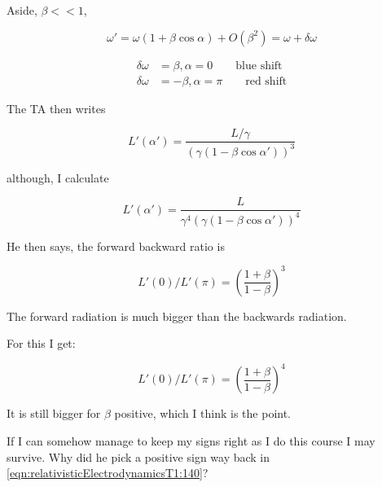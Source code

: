 Aside, $\beta << 1$, 

\begin{equation}\label{eqn:relativisticElectrodynamicsT1:230}
\omega' = \omega ( 1 + \beta \cos\alpha) + O(\beta^2) = \omega + \delta \omega
\end{equation}

\begin{align}\label{eqn:relativisticElectrodynamicsT1:240}
\delta \omega &= \beta, \alpha = 0 		\qquad \text{blue shift} \\
\delta \omega &= -\beta, \alpha = \pi 		\qquad \text{red shift}
\end{align}

The TA then writes

\begin{equation}\label{eqn:relativisticElectrodynamicsT1:241}
L'(\alpha') = \frac{L/\gamma}{(\gamma (1 - \beta \cos\alpha'))^3}
\end{equation}

although, I calculate

\begin{equation}\label{eqn:relativisticElectrodynamicsT1:241me}
L'(\alpha') = \frac{L}{\gamma^4 (\gamma (1 - \beta \cos\alpha'))^4}
\end{equation}

He then says, the forward backward ratio is

\begin{equation}\label{eqn:relativisticElectrodynamicsT1:250}
L'(0)/L'(\pi) = {\left( \frac{ 1 + \beta }{1-\beta} \right)}^3
\end{equation}

The forward radiation is much bigger than the backwards radiation.

For this I get:

\begin{equation}\label{eqn:relativisticElectrodynamicsT1:250me}
L'(0)/L'(\pi) = {\left( \frac{ 1 + \beta }{1-\beta} \right)}^4
\end{equation}

It is still bigger for $\beta$ positive, which I think is the point.

If I can somehow manage to keep my signs right as I do this course I may survive.  Why did he pick a positive sign way back in \ref{eqn:relativisticElectrodynamicsT1:140}?

\EndArticle
